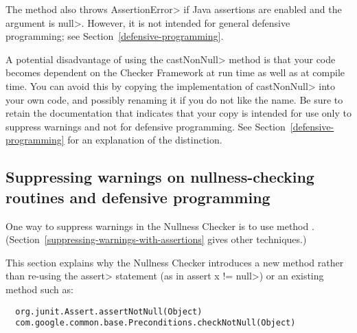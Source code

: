 \begin{enumerate}
  The method also throws \<AssertionError> if Java assertions are enabled and
  the argument is \<null>.  However, it is not intended for general defensive
  programming; see Section~\ref{defensive-programming}.

  A potential disadvantage of using the \<castNonNull> method is that your
  code becomes dependent on the Checker Framework at run time as well as at
  compile time.  You can avoid this by copying the implementation of
  \<castNonNull> into your own code, and possibly renaming it if you do not
  like the name.  Be sure to retain the documentation that indicates that
  your copy is intended for use only to suppress warnings and not for
  defensive programming.  See Section~\ref{defensive-programming} for an
  explanation of the distinction.


\end{enumerate}


\subsection{Suppressing warnings on nullness-checking routines and defensive programming\label{defensive-programming}}

%


One way to suppress warnings in the Nullness Checker is to use
method .
(Section~\ref{suppressing-warnings-with-assertions} gives other techniques.)

This section explains why the Nullness Checker introduces a new method
rather than re-using the \<assert> statement (as in
\<assert x != null>) or an existing method such as:

\begin{Verbatim}
  org.junit.Assert.assertNotNull(Object)
  com.google.common.base.Preconditions.checkNotNull(Object)
\end{Verbatim}

